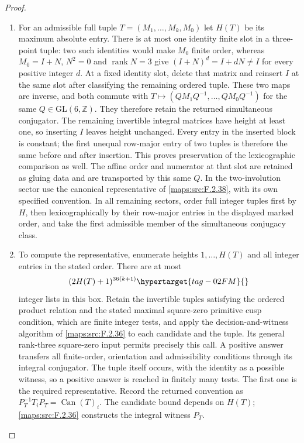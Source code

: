 \documentclass[11pt,a4paper]{article}
\numberwithin{equation}{section}
\theoremstyle{definition}
\begin{document}
\begin{proof}
\begin{enumerate}[label=\arabic*.]
\item For an admissible full tuple $T=(M_1,\ldots,M_k,M_0)$ let
$H(T)$ be its maximum absolute entry. There is at most one identity
finite slot in a three-point tuple: two such identities would make
$M_0$ finite order, whereas $M_0=I+N$, $N^2=0$ and
$\operatorname{rank}N=3$ give $(I+N)^d=I+dN\ne I$ for every
positive integer $d$. At a fixed identity slot, delete that matrix
and reinsert $I$ at the same slot after classifying the remaining
ordered tuple. These two maps are inverse, and both commute with
$T\mapsto (QM_1Q^{-1},\ldots,QM_0Q^{-1})$ for the same
$Q\in\mathrm{GL}(6,\mathbb Z)$. They therefore retain the returned simultaneous conjugator. The remaining invertible integral
matrices have height at least one, so inserting $I$ leaves height
unchanged. Every entry in the inserted block is constant; the first
unequal row-major entry of two tuples is therefore the same before
and after insertion. This proves preservation of the lexicographic comparison as well. The affine order and
numerator at that slot are retained as gluing data and are transported
by this same $Q$. In the two-involution sector use the canonical
representative of \ref{maps:src:F.2.38}, with its own specified
convention. In all remaining sectors, order full integer tuples
first by $H$, then lexicographically by their row-major entries in
the displayed marked order, and take the first admissible member
of the simultaneous conjugacy class.

\item To compute the representative, enumerate heights
$1,\ldots,H(T)$ and all integer entries in the stated order.
There are at most
\begin{equation}
 (2H(T)+1)^{36(k+1)}
 \hypertarget{tag-02FM}{}\label{maps:eq:F.CN2}
\end{equation}
integer lists in this box. Retain the invertible tuples satisfying
the ordered product relation and the stated maximal square-zero
primitive cusp condition, which are finite integer tests, and
apply the decision-and-witness algorithm of
\cref{maps:src:F.2.36} to each candidate and the tuple.
Its general rank-three square-zero input permits precisely this
call. A positive answer transfers all finite-order, orientation
and admissibility conditions through its integral
conjugator. The tuple itself occurs, with the identity
as a possible witness, so a positive answer is reached in
finitely many tests. The first one is the required representative.
Record the returned convention as
$P_T^{-1}T_iP_T=\operatorname{Can}(T)_i$.
The candidate bound depends on $H(T)$; \cref{maps:src:F.2.36} constructs the integral witness $P_T$.


\end{enumerate}
\end{proof}
\end{document}
